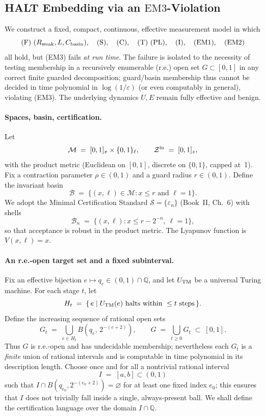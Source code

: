 \documentclass[12pt]{article}
\theoremstyle{definition}
\theoremstyle{plain}
\begin{document}
\subsection{HALT Embedding via an \texorpdfstring{$\mathrm{EM3}$}{EM3}-Violation}
\label{sec:em3-violation}

We construct a fixed, compact, continuous, effective measurement model in which
\[
\textup{(F)}\ (R_{\mathrm{weak}},L,C_{\rm basin}),\quad
\textup{(S)},\quad
\textup{(C)},\quad
\textup{(T)}\ (\text{PL}),\quad
\textup{(I)},\quad
\textup{(EM1)},\quad
\textup{(EM2)}
\]
all hold, but \textup{(EM3)} fails \emph{at run time}. The failure is isolated to
the necessity of testing membership in a recursively enumerable (r.e.) open set
\(G\subset[0,1]\) in any correct finite guarded decomposition; guard/basin
membership thus cannot be decided in time polynomial in \(\log(1/\varepsilon)\)
(or even computably in general), violating \textup{(EM3)}. The underlying
dynamics \(U,E\) remain fully effective and benign.

\paragraph{Spaces, basin, certification.}
Let
\[
\mathcal M \;=\; [0,1]_x \times \{0,1\}_\ell,\qquad
\mathcal Z^{\rm in} \;=\; [0,1]_z,
\]
with the product metric (Euclidean on \([0,1]\), discrete on \(\{0,1\}\), capped at~1).
Fix a contraction parameter \(\rho\in(0,1)\) and a guard radius \(r\in(0,1)\).
Define the invariant basin
\[
\mathcal B \;=\; \{(x,\ell)\in\mathcal M : x\le r \text{ and } \ell=1\}.
\]
We adopt the Minimal Certification Standard \(\mathcal S=\{\varepsilon_n\}\) (Book~II, Ch.~6)
with shells
\[
\mathcal B_n \;=\;\bigl\{(x,\ell): x\le r-2^{-n},\ \ell=1\bigr\},
\]
so that acceptance is robust in the product metric. The Lyapunov function is \(V(x,\ell)=x\).

\paragraph{An r.e.-open target set and a fixed subinterval.}
Fix an effective bijection \(e\mapsto q_e\in(0,1)\cap\mathbb Q\), and let \(U_{\rm TM}\) be a
universal Turing machine. For each stage \(t\), let
\[
H_t \;=\; \{\,e \mid U_{\rm TM}(e)\ \text{halts within }\le t\text{ steps}\,\}.
\]
Define the increasing sequence of rational open sets
\[
G_t \;=\; \bigcup_{e\in H_t} B\!\left(q_e,\,2^{-(e+2)}\right),\qquad
G \;=\; \bigcup_{t\ge 0} G_t \;\subset\;[0,1].
\]
Thus \(G\) is r.e.-open and has undecidable membership; nevertheless each \(G_t\) is a \emph{finite}
union of rational intervals and is computable in time polynomial in its description length.
Choose once and for all a nontrivial rational interval
\[
I \;=\; [a,b] \subset (0,1)
\]
such that \(I\cap B(q_{e_0},2^{-(e_0+2)})=\varnothing\) for at least one fixed index \(e_0\); this ensures
that \(I\) does not trivially fall inside a single, always-present ball. We shall define the
certification language over the domain \(I\cap\mathbb Q\).
\end{document}
